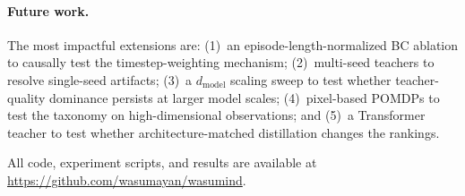 \paragraph{Future work.}
The most impactful extensions are: (1)~an episode-length-normalized BC ablation to causally test the timestep-weighting mechanism; (2)~multi-seed teachers to resolve single-seed artifacts; (3)~a $d_\text{model}$ scaling sweep to test whether teacher-quality dominance persists at larger model scales; (4)~pixel-based POMDPs to test the taxonomy on high-dimensional observations; and (5)~a Transformer teacher to test whether architecture-matched distillation changes the rankings.

All code, experiment scripts, and results are available at \url{https://github.com/wasumayan/wasumind}.
